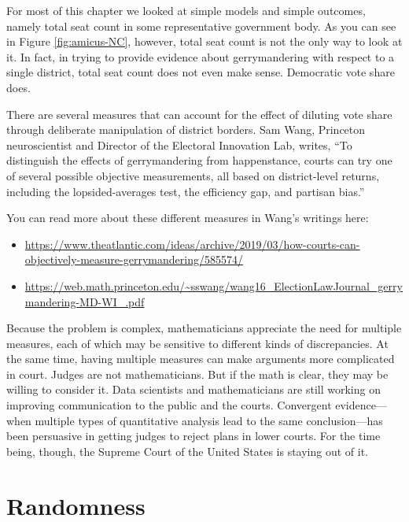 \documentclass[
  openany]{book}
\providecommand{\tightlist}{%
  \setlength{\itemsep}{0pt}\setlength{\parskip}{0pt}}
\begin{document}
For most of this chapter we looked at simple models and simple outcomes, namely total seat count in some representative government body. As you can see in Figure \ref{fig:amicus-NC}, however, total seat count is not the only way to look at it. In fact, in trying to provide evidence about gerrymandering with respect to a single district, total seat count does not even make sense. Democratic vote share does.

There are several measures that can account for the effect of diluting vote share through deliberate manipulation of district borders. Sam Wang, Princeton neuroscientist and Director of the Electoral Innovation Lab, writes, ``To distinguish the effects of gerrymandering from happenstance, courts can try one of several possible objective measurements, all based on district-level returns, including the lopsided-averages test, the efficiency gap, and partisan bias.''

You can read more about these different measures in Wang's writings here:

\begin{itemize}
\tightlist
\item
  \url{https://www.theatlantic.com/ideas/archive/2019/03/how-courts-can-objectively-measure-gerrymandering/585574/}
\item
  \url{https://web.math.princeton.edu/~sswang/wang16_ElectionLawJournal_gerrymandering-MD-WI_.pdf}
\end{itemize}

Because the problem is complex, mathematicians appreciate the need for multiple measures, each of which may be sensitive to different kinds of discrepancies. At the same time, having multiple measures can make arguments more complicated in court. Judges are not mathematicians. But if the math is clear, they may be willing to consider it. Data scientists and mathematicians are still working on improving communication to the public and the courts. Convergent evidence---when multiple types of quantitative analysis lead to the same conclusion---has been persuasive in getting judges to reject plans in lower courts. For the time being, though, the Supreme Court of the United States is staying out of it.

\hypertarget{appendix-appendix}{%
\appendix}


\hypertarget{sec:randomness}{%
\chapter{Randomness}\label{sec:randomness}}
\end{document}
